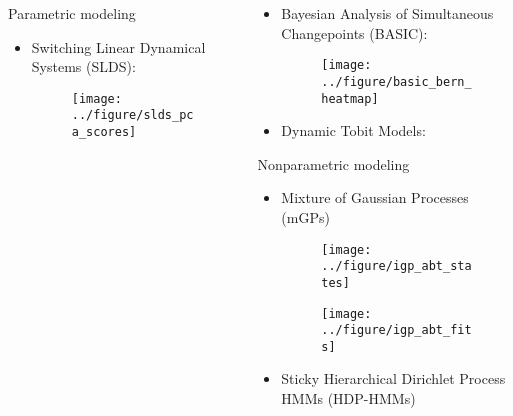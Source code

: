 \documentclass[final, 8pt]{beamer}
\newlength{\onecolwid}
\begin{document}
\begin{frame}
\begin{columns}
\begin{column}{\onecolwid}
\begin{block}{Parametric modeling}
\begin{itemize}
\item Switching Linear Dynamical Systems (SLDS):

\begin{figure}[ht]
  \centering
  \texttt{[image: ../figure/slds\_pca\_scores]}
  \caption{\label{fig:slds_pca_scores} }
\end{figure}

\end{itemize}

\end{block}

\end{column}
\begin{column}{\onecolwid}

\begin{itemize}
\item Bayesian Analysis of Simultaneous Changepoints (BASIC):
\begin{figure}[ht]
  \centering
  \texttt{[image: ../figure/basic\_bern\_heatmap]}
  \caption{\label{fig:basic_bern_heamtap} }
\end{figure}
\item Dynamic Tobit Models:
\end{itemize}

\begin{block}{Nonparametric modeling}
\begin{itemize}
\item Mixture of Gaussian Processes (mGPs)
\begin{figure}[!p]
  \centering
  \texttt{[image: ../figure/igp\_abt\_states]}
  \caption{\label{fig:igp_abt_states}}
\end{figure}

\begin{figure}[!p]
  \centering
  \texttt{[image: ../figure/igp\_abt\_fits]}
  \caption{\label{fig:igp_abt_fits}}
\end{figure}

\item Sticky Hierarchical Dirichlet Process HMMs (HDP-HMMs)
\end{itemize}
\end{block}

\begingroup
    \fontsize{14pt}{14pt}\selectfont
 
 
 \endgroup
\end{column}
\end{columns}

\end{frame}
\end{document}
